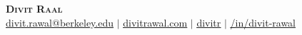 \begin{center}
    \textbf{\Huge \scshape Divit Raal} \\
    \vspace{1pt}
    \faEnvelope{} \href{mailto:divit.rawal@berkeley.edu}{\underline{divit.rawal@berkeley.edu}} $|$ 
    \faGlobe{} \href{https://www.divitrawal.com}{\underline{divitrawal.com}} $|$
    \faGithub{} \href{https://www.github.com/divitr}{\underline{divitr}} $|$
    \faLinkedin{} \href{https://www.linkedin.com/in/divit-rawal}{\underline{/in/divit-rawal}}
\end{center}